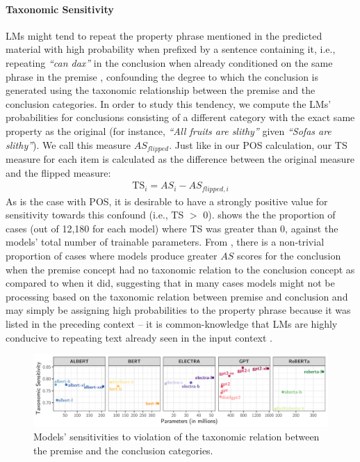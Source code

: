 \documentclass[a4paper, 11pt]{article}
\begin{document}
\paragraph{Taxonomic Sensitivity}
LMs might tend to repeat the property phrase mentioned in the predicted material with high probability when prefixed by a sentence containing it, i.e., repeating \textit{``can dax''} in the conclusion when already conditioned on the same phrase in the premise \citep{holtzman2019curious}, confounding the degree to which the conclusion is generated using the taxonomic relationship between the premise and the conclusion categories.
In order to study this tendency, we compute the LMs' probabilities for conclusions consisting of a different category with the exact same property as the original (for instance, \textit{``All fruits are slithy''} given \textit{``Sofas are slithy''}). We call this measure $AS_{\textit{flipped}}$. Just like in our POS calculation, our TS measure for each item is calculated as the difference between the original measure and the flipped measure:
\begin{align}
    \text{TS}_i = AS_i - AS_{\textit{flipped}, i}
\end{align}
As is the case with POS, it is desirable to have a strongly positive value for sensitivity towards this confound (i.e., TS $>$ 0). 
 shows the the proportion of cases (out of 12{,}180 for each model) where TS was greater than 0, against the models' total number of trainable parameters.
From , there is a non-trivial proportion of cases where models produce greater $AS$ scores for the conclusion when the premise concept had no taxonomic relation to the conclusion concept as compared to when it did, suggesting that in many cases models might not be processing based on the taxonomic relation between premise and conclusion and may simply be assigning high probabilities to the property phrase because it was listed in the preceding context -- it is common-knowledge that LMs are highly conducive to repeating text already seen in the input context \citep{holtzman2019curious}.

\begin{figure}[!th]
    \includegraphics[width = \textwidth]{../paper/ts_confound.pdf}
    \caption{Models' sensitivities to violation of the taxonomic relation between the premise and the conclusion categories.}
    \label{fig:cogsci21ts}
\end{figure}
\end{document}
